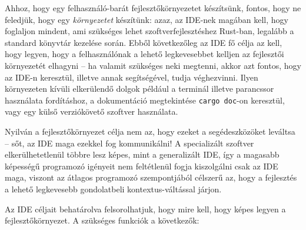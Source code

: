 



Ahhoz, hogy egy felhasználó-barát fejlesztőkörnyezetet készítsünk, fontos, hogy ne feledjük, hogy egy \emph{környezetet} készítünk: azaz, az IDE-nek magában kell, hogy foglaljon mindent, ami szükséges lehet szoftverfejlesztéshez Rust-ban, legalább a standard könyv\-tár kezelése során. Ebből következőleg az IDE fő célja az kell, hogy legyen, hogy a felhasználónak a lehető legkevesebbet kelljen az fejlesztői környezetét elhagyni -- ha valamit szükséges neki megtenni, akkor azt fontos, hogy az IDE-n keresztül, illetve annak segítségével, tudja véghezvinni. Ilyen környezeten kívüli elkerülendő dolgok pél\-dá\-ul a terminál illetve parancssor használata fordításhoz, a dokumentáció megtekintése \texttt{cargo doc}-on keresztül, vagy egy külső verziókövető szoftver használata.

Nyilván a fejlesztőkörnyezet célja nem az, hogy ezeket a segédeszközöket leváltsa -- sőt, az IDE maga ezekkel fog kommunikálni! A specializált szoftver elkerülhetetlenül többre lesz képes, mint a generalizált IDE, így a magasabb képességű programozó igényeit nem feltétlenül fogja kiszolgálni csak az IDE maga, viszont az átlagos prog\-ra\-mo\-zó szempontjából célszerű az, hogy a fejlesztés a lehető legkevesebb gondolatbeli kontextus-váltással járjon.

Az IDE céljait behatárolva felsorolhatjuk, hogy mire kell, hogy képes legyen a fejlesztőkörnyezet. A szükséges funkciók a következők:

